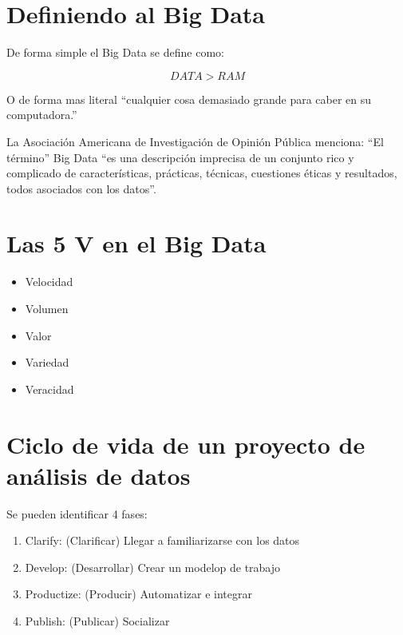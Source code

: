 \documentclass[
]{book}
\providecommand{\tightlist}{%
  \setlength{\itemsep}{0pt}\setlength{\parskip}{0pt}}
\begin{document}
\hypertarget{definiendo-al-big-data}{%
\section{Definiendo al Big Data}\label{definiendo-al-big-data}}

De forma simple el Big Data se define como:

\[DATA>RAM\]

O de forma mas literal ``cualquier cosa demasiado grande para caber en su computadora.''

La Asociación Americana de Investigación de Opinión Pública menciona: ``El término'' Big Data ``es una descripción imprecisa de un conjunto rico y complicado de características, prácticas, técnicas, cuestiones éticas y resultados, todos asociados con los datos''.

\hypertarget{las-5-v-en-el-big-data}{%
\section{Las 5 V en el Big Data}\label{las-5-v-en-el-big-data}}

\begin{itemize}
\tightlist
\item
  Velocidad
\item
  Volumen
\item
  Valor
\item
  Variedad
\item
  Veracidad
\end{itemize}

\hypertarget{ciclo-de-vida-de-un-proyecto-de-anuxe1lisis-de-datos}{%
\section{Ciclo de vida de un proyecto de análisis de datos}\label{ciclo-de-vida-de-un-proyecto-de-anuxe1lisis-de-datos}}

Se pueden identificar 4 fases:

\begin{enumerate}
\def\labelenumi{\arabic{enumi}.}
\tightlist
\item
  Clarify: (Clarificar) Llegar a familiarizarse con los datos
\item
  Develop: (Desarrollar) Crear un modelop de trabajo
\item
  Productize: (Producir) Automatizar e integrar
\item
  Publish: (Publicar) Socializar
\end{enumerate}
\end{document}
